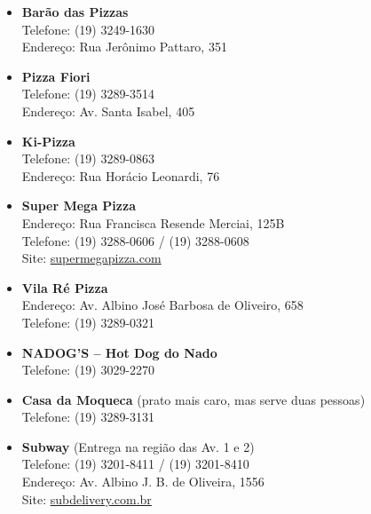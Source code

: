 \begin{itemize}
    \item   \textbf{Barão das Pizzas}
        \\Telefone: (19) 3249-1630
        \\Endereço: Rua Jerônimo Pattaro, 351

    \item   \textbf{Pizza Fiori}
        \\Telefone: (19) 3289-3514
        \\Endereço: Av. Santa Isabel, 405

    \item   \textbf{Ki-Pizza}
        \\Telefone: (19) 3289-0863
        \\Endereço: Rua Horácio Leonardi, 76

    \item   \textbf{Super Mega Pizza}
        \\Endereço: Rua Francisca Resende Merciai, 125B
        \\Telefone: (19) 3288-0606 / (19) 3288-0608
        \\Site: \url{supermegapizza.com}

    \item   \textbf{Vila Ré Pizza}
        \\Endereço: Av. Albino José Barbosa de Oliveiro, 658
        \\Telefone: (19) 3289-0321

    \item   \textbf{NADOG'S -- Hot Dog do Nado}
        \\Telefone: (19) 3029-2270

    \item   \textbf{Casa da Moqueca} (prato mais caro, mas serve duas pessoas)
        \\Telefone: (19) 3289-3131

    \item   \textbf{Subway} (Entrega na região das Av. 1 e 2)
        \\Telefone: (19) 3201-8411 / (19) 3201-8410
        \\Endereço: Av. Albino J. B. de Oliveira, 1556
        \\Site: \url{subdelivery.com.br}



\end{itemize}
